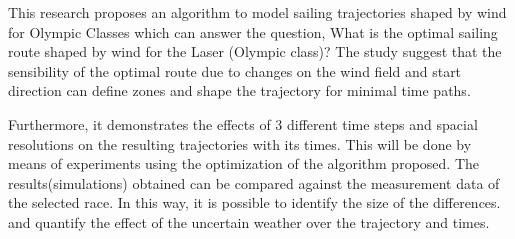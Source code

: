 This research proposes an algorithm to model sailing trajectories shaped by wind for Olympic Classes which %
can answer the question, What is the optimal sailing route shaped by wind for the Laser (Olympic class)?  The study suggest that the sensibility of the optimal route due to changes on the wind field and start direction can define zones and shape the trajectory for minimal time paths. \par 

Furthermore, it demonstrates the effects of 3 different time steps and spacial resolutions on the resulting trajectories with its times. This will be done by means of experiments using the optimization of the algorithm proposed. The results(simulations) obtained can be compared against the measurement data of the selected race. In this way, it is possible to identify the size of the differences. and quantify the effect of the uncertain weather over the trajectory and times.\par 

